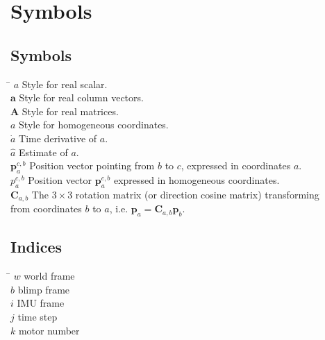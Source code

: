 \chapter*{Symbols}
\label{sec:symbols}

\section*{Symbols}

\begin{tabbing}
 \hspace*{1.6cm} \= \kill
  $a$                     \> Style for real scalar. \\[0.5ex]
  $\mathbf{a}$            \> Style for real column vectors. \\[0.5ex]
  $\mathbf{A}$            \> Style for real matrices. \\[0.5ex]
  $\mathbf{\textit{a}}$   \> Style for homogeneous coordinates. \\[0.5ex]
  $\dot{a}$               \> Time derivative of $a$. \\[0.5ex]
  $\hat{a}$               \> Estimate of $a$. \\[0.5ex]
  $\mathbf{p}^{c,b}_a$    \> Position vector pointing from $b$ to $c$, expressed in coordinates $a$. \\[0.5ex]
  $\mathbf{\textit{p}}^{c,b}_a$    \> Position vector $\mathbf{p}^{c,b}_a$ expressed in homogeneous coordinates. \\[0.5ex]
  $\mathbf{C}_{a,b}$      \> The $3\times3$ rotation matrix (or direction cosine matrix) transforming \\
                          \> from coordinates $b$ to $a$, i.e. $\mathbf{p}_a=\mathbf{C}_{a,b}\mathbf{p}_b$. \\[0.5ex]

\end{tabbing}

\section*{Indices}

\begin{tabbing}
 \hspace*{1.6cm}  \= \kill
 $w$ \> world frame \\[0.5ex]
 $b$ \> blimp frame \\[0.5ex]
 $i$ \> IMU frame \\[0.5ex]
 $j$ \> time step \\[0.5ex]
 $k$ \> motor number \\[0.5ex]
\end{tabbing}

